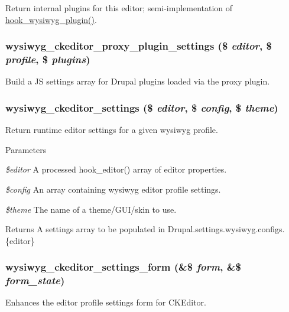 \label{ckeditor_8inc_ab92e1bed993d878f7258749b02d074a1}
Return internal plugins for this editor; semi-\/implementation of \hyperlink{wysiwyg_8api_8php_abad2b35b32be0b20d73006b73205045c}{hook\_\-wysiwyg\_\-plugin()}. \hypertarget{ckeditor_8inc_a5445976f1dfa660b7287237151bca2ad}{
\subsubsection[{wysiwyg\_\-ckeditor\_\-proxy\_\-plugin\_\-settings}]{\setlength{\rightskip}{0pt plus 5cm}wysiwyg\_\-ckeditor\_\-proxy\_\-plugin\_\-settings (\$ {\em editor}, \/  \$ {\em profile}, \/  \$ {\em plugins})}}
\label{ckeditor_8inc_a5445976f1dfa660b7287237151bca2ad}
Build a JS settings array for Drupal plugins loaded via the proxy plugin. \hypertarget{ckeditor_8inc_a43ec7d691d35f31180b2d401fa3bde6d}{
\subsubsection[{wysiwyg\_\-ckeditor\_\-settings}]{\setlength{\rightskip}{0pt plus 5cm}wysiwyg\_\-ckeditor\_\-settings (\$ {\em editor}, \/  \$ {\em config}, \/  \$ {\em theme})}}
\label{ckeditor_8inc_a43ec7d691d35f31180b2d401fa3bde6d}
Return runtime editor settings for a given wysiwyg profile.


\begin{DoxyParams}{Parameters}
\item[{\em \$editor}]A processed hook\_\-editor() array of editor properties. \item[{\em \$config}]An array containing wysiwyg editor profile settings. \item[{\em \$theme}]The name of a theme/GUI/skin to use.\end{DoxyParams}
\begin{DoxyReturn}{Returns}
A settings array to be populated in Drupal.settings.wysiwyg.configs.\{editor\} 
\end{DoxyReturn}
\hypertarget{ckeditor_8inc_a99ea1c868cbd240643f8f9299b73be3f}{
\subsubsection[{wysiwyg\_\-ckeditor\_\-settings\_\-form}]{\setlength{\rightskip}{0pt plus 5cm}wysiwyg\_\-ckeditor\_\-settings\_\-form (\&\$ {\em form}, \/  \&\$ {\em form\_\-state})}}
\label{ckeditor_8inc_a99ea1c868cbd240643f8f9299b73be3f}
Enhances the editor profile settings form for CKEditor.

